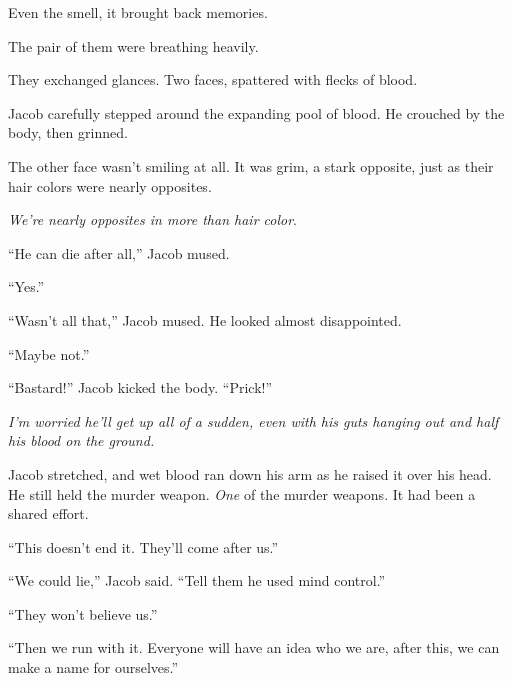 Even the smell, it brought back memories.



\sectionbreak






The pair of them were breathing heavily.



They exchanged glances.  Two faces, spattered with flecks of blood.



Jacob carefully stepped around the expanding pool of blood.  He crouched by the body, then grinned.



The other face wasn't smiling at all.  It was grim, a stark opposite, just as their hair colors were nearly opposites.



\emph{We're}\emph{ nearly opposites in more than hair color}.



``He can die after all,'' Jacob mused.



``Yes.''



``Wasn't all that,'' Jacob mused.  He looked almost disappointed.



``Maybe not.''



``Bastard!''  Jacob kicked the body.  ``Prick!''



\emph{I'm worried he'll get up all of a sudden, even with his guts hanging out and half his blood on the ground.}



Jacob stretched, and wet blood ran down his arm as he raised it over his head.  He still held the murder weapon.  \emph{One} of the murder weapons.  It had been a shared effort.



``This doesn't end it.  They'll come after us.''



``We could lie,'' Jacob said.  ``Tell them he used mind control.''



``They won't believe us.''



``Then we run with it.  Everyone will have an idea who we are, after this, we can make a name for ourselves.''



